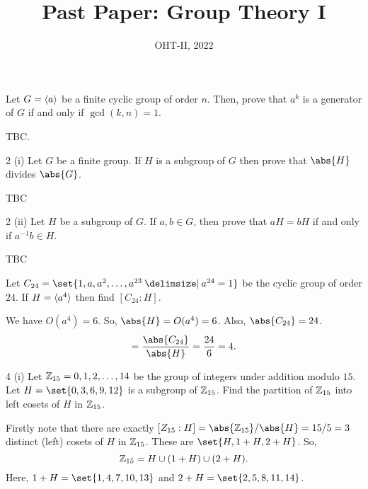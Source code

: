 \documentclass[11pt]{penrose}
\title{Past Paper: Group Theory I}
\subtitle{OHT-II, 2022}
\begin{document}
\maketitle
\warningtext

\begin{problem}{1}
    Let $G = \langle a\rangle$ be a finite cyclic group of order $n$. Then, prove that $a^k$ is a generator of $G$ if and only if $\gcd(k,n) = 1$.

    \solution TBC.
\end{problem}

\begin{problem}{2 (i)}
    Let $G$ be a finite group. If $H$ is a subgroup of $G$ then prove that $\abs{H}$ divides $\abs{G}$.

    \solution TBC
\end{problem}

\begin{problem}{2 (ii)}
    Let $H$ be a subgroup of $G$. If $a, b \in G$, then prove that $aH = bH$ if and only if $a^{-1}b \in H$.

    \solution TBC
\end{problem}

\begin{problem}{3}
    Let $C_{24} = \set{1, a, a^2, \dots, a^{23} \st a^{24}=1}$ be the cyclic group of order $24$. If $H = \langle a^4\rangle$ then find $[C_{24} : H]$.

    \solution We have $O(a^4) = 6$. So, $\abs{H} = O(a^4) = 6$. Also, $\abs{C_{24}} = 24$.
    \begin{equation*}
        [C_{24} : H] = \frac{\abs{C_{24}}}{\abs{H}} = \frac{24}{6} = 4.
    \end{equation*}
\end{problem}

\begin{problem}{4 (i)}
    Let $\mathbb{Z}_{15} = {0,1,2,\dots,14}$ be the group of integers under addition modulo $15$. Let $H = \set{0,3,6,9,12}$ is a subgroup of $\mathbb{Z}_{15}$. Find the partition of $\mathbb{Z}_{15}$ into left cosets of $H$ in $\mathbb{Z}_{15}$.

    \solution Firstly note that there are exactly $[Z_{15} : H] = \abs{\Z_{15}}/\abs{H} = 15/5 = 3$ distinct (left) cosets of $H$ in $\mathbb{Z}_{15}$. These are $\set{H, 1+H, 2+H}$. So,
    \begin{equation*}
        \mathbb{Z}_{15} = H \cup (1+H) \cup (2+H).
    \end{equation*}
    Here, $1+H = \set{1,4,7,10,13}$ and $2+H = \set{2,5,8,11,14}$.
\end{problem}
\end{document}
